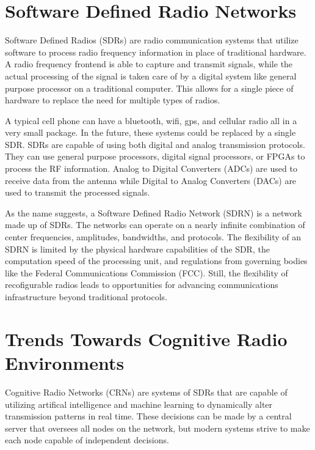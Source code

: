 
\section{Software Defined Radio Networks}

Software Defined Radios (SDRs) are radio communication systems that utilize software to process radio frequency information in place of traditional hardware. A radio frequency frontend is able to capture and transmit signals, while the actual processing of the signal is taken care of by a digital system like general purpose processor on a traditional computer. This allows for a single piece of hardware to replace the need for multiple types of radios.

A typical cell phone can have a bluetooth, wifi, gps, and cellular radio all in a very small package. In the future, these systems could be replaced by a single SDR. SDRs are capable of using both digital and analog transmission protocols. They can use general purpose processors, digital signal processors, or FPGAs to process the RF information. Analog to Digital Converters (ADCs) are used to receive data from the antenna while Digital to Analog Converters (DACs) are used to transmit the processed signals. 

As the name suggests, a Software Defined Radio Network (SDRN) is a network made up of SDRs. The networks can operate on a nearly infinite combination of center frequencies, amplitudes, bandwidths, and protocols. The flexibility of an SDRN is limited by the physical hardware capabilities of the SDR, the computation speed of the processing unit, and regulations from governing bodies like the Federal Communications Commission (FCC). Still, the flexibility of recofigurable radios leads to opportunities for advancing communications infrastructure beyond traditional protocols. 
 

\section{Trends Towards Cognitive Radio Environments}

Cognitive Radio Networks (CRNs) are systems of SDRs that are capable of utilizing artifical intelligence and machine learning to dynamically alter transmission patterns in real time. These decisions can be made by a central server that oversees all nodes on the network, but modern systems strive to make each node capable of independent decisions. 

